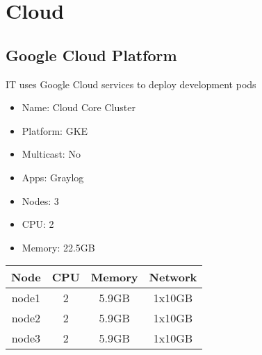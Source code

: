 \newpage
\section{Cloud}
\subsection{Google Cloud Platform}
IT uses Google Cloud services to deploy development pods
\begin{itemize}
  \itemsep0em 
  \item Name:      Cloud Core Cluster
  \item Platform:  GKE
  \item Multicast: No
  \item Apps:      Graylog
  \item Nodes:     3
  \item CPU:       2
  \item Memory:    22.5GB
\end{itemize}
\begin{center}
  \small
  \begin{tabular}{||c c c c||}
    \hline
    Node & CPU & Memory & Network \\ [0.5ex]
    \hline
    node1 & 2 & 5.9GB & 1x10GB \\
    \hline
    node2 & 2 & 5.9GB & 1x10GB \\
    \hline
    node3 & 2 & 5.9GB & 1x10GB \\
    \hline
  \end{tabular}
\end{center}
